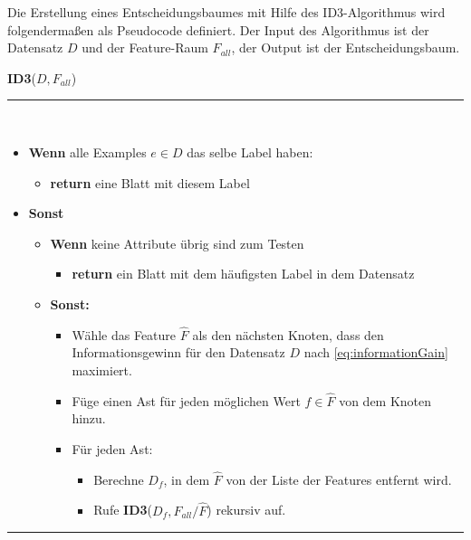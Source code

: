 Die Erstellung eines Entscheidungsbaumes mit Hilfe des ID3-Algorithmus wird folgendermaßen als Pseudocode definiert. Der Input des Algorithmus ist der Datensatz $D$ und der Feature-Raum $F_{all}$, der Output ist der Entscheidungsbaum.\cite[S. 139]{machine_marsland}
\vspace{4mm}

\noindent\textbf{ID3}($D,F_{all}$) \noindent\rule{0.85\linewidth}{0.3pt} \\[-3mm]
\begin{itemize}
\item \textbf{Wenn} alle Examples $e \in D$ das selbe Label haben:
	\begin{itemize}
	\item \textbf{return} eine Blatt mit diesem Label
	\end{itemize}
\item \textbf{Sonst}
	\begin{itemize} 
	\item \textbf{Wenn} keine Attribute übrig sind zum Testen
		\begin{itemize}
		\item \textbf{return} ein Blatt mit dem häufigsten Label in dem Datensatz
		\end{itemize}
	\item \textbf{Sonst:} 
		\begin{itemize}
		\item Wähle das Feature $\hat{F}$ als den nächsten Knoten, dass den Informationsgewinn für den Datensatz $D$ nach \autoref{eq:informationGain} maximiert.
		\item Füge einen Ast für jeden möglichen Wert $f \in \hat{F}$ von dem Knoten hinzu.
		\item Für jeden Ast:
			\begin{itemize}
			\item Berechne $D_f$, in dem $\hat{F}$ von der Liste der Features entfernt wird.
			\item Rufe \textbf{ID3}($D_f, F_{all} / \hat{F}$) rekursiv auf.
			\end{itemize}
		\end{itemize}
	\end{itemize} 
\end{itemize}

\noindent\rule{\linewidth}{0.3pt}

\vspace{3mm}

